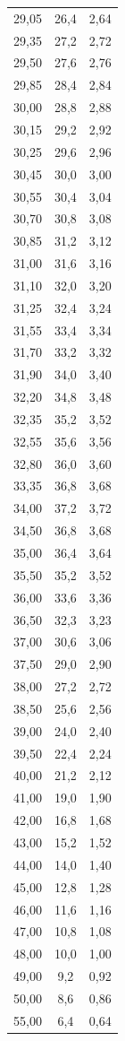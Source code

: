 \begin{table}
\begin{tabular}{S S S}
       29,05 & 26,4 & 2,64\\
       29,35 & 27,2 & 2,72\\
       29,50 & 27,6 & 2,76\\
       29,85 & 28,4 & 2,84\\
       30,00 & 28,8 & 2,88\\
       30,15 & 29,2 & 2,92\\
       30,25 & 29,6 & 2,96\\
       30,45 & 30,0 & 3,00\\
       30,55 & 30,4 & 3,04\\
       30,70 & 30,8 & 3,08\\
       30,85 & 31,2 & 3,12\\
       31,00 & 31,6 & 3,16\\
       31,10 & 32,0 & 3,20\\
       31,25 & 32,4 & 3,24\\
       31,55 & 33,4 & 3,34\\
       31,70 & 33,2 & 3,32\\
       31,90 & 34,0 & 3,40\\
       32,20 & 34,8 & 3,48\\
       32,35 & 35,2 & 3,52\\
       32,55 & 35,6 & 3,56\\
       32,80 & 36,0 & 3,60\\
       33,35 & 36,8 & 3,68\\
       34,00 & 37,2 & 3,72\\
       34,50 & 36,8 & 3,68\\
       35,00 & 36,4 & 3,64\\
       35,50 & 35,2 & 3,52\\
       36,00 & 33,6 & 3,36\\
       36,50 & 32,3 & 3,23\\
       37,00 & 30,6 & 3,06\\
       37,50 & 29,0 & 2,90\\
       38,00 & 27,2 & 2,72\\
       38,50 & 25,6 & 2,56\\
       39,00 & 24,0 & 2,40\\
       39,50 & 22,4 & 2,24\\
       40,00 & 21,2 & 2,12\\
       41,00 & 19,0 & 1,90\\
       42,00 & 16,8 & 1,68\\
       43,00 & 15,2 & 1,52\\
       44,00 & 14,0 & 1,40\\
       45,00 & 12,8 & 1,28\\
       46,00 & 11,6 & 1,16\\
       47,00 & 10,8 & 1,08\\
       48,00 & 10,0 & 1,00\\
       49,00 & 9,2 & 0,92\\
       50,00 & 8,6 & 0,86\\
       55,00 & 6,4 & 0,64\\
    \bottomrule
    \end{tabular}
    \end{table}
